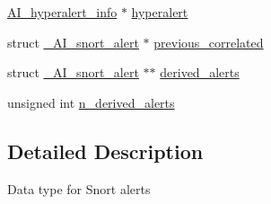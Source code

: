 \begin{DoxyCompactItemize}
\hyperlink{structAI__hyperalert__info}{AI\_\-hyperalert\_\-info} $\ast$ \hyperlink{struct__AI__snort__alert_ac101de15b4f9451f235b82122f77b62a}{hyperalert}
\item 
struct \hyperlink{struct__AI__snort__alert}{\_\-AI\_\-snort\_\-alert} $\ast$ \hyperlink{struct__AI__snort__alert_a55a5488c7ee7706ded4c16b1235fd9c7}{previous\_\-correlated}
\item 
struct \hyperlink{struct__AI__snort__alert}{\_\-AI\_\-snort\_\-alert} $\ast$$\ast$ \hyperlink{struct__AI__snort__alert_aac5e4078600ed17532db1f3d78165390}{derived\_\-alerts}
\item 
unsigned int \hyperlink{struct__AI__snort__alert_a1f2d5e8cfd0e6321b977173d1e90cb68}{n\_\-derived\_\-alerts}
\end{DoxyCompactItemize}


\subsection{Detailed Description}
Data type for Snort alerts 

